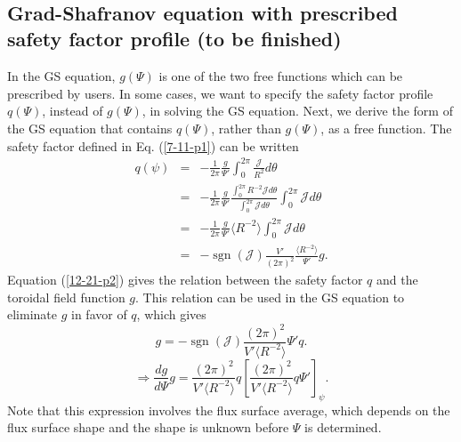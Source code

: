\documentclass{llncs}
\newcommand{\tmop}[1]{\ensuremath{\operatorname{#1}}}
\begin{document}
\

\subsection{Grad-Shafranov equation with prescribed safety factor profile (to
be finished)}

In the GS equation, $g (\Psi)$ is one of the two free functions which can be
prescribed by users. In some cases, we want to specify the safety factor
profile $q (\Psi)$, instead of $g (\Psi)$, in solving the GS equation. Next,
we derive the form of the GS equation that contains $q (\Psi)$, rather than $g
(\Psi)$, as a free function. The safety factor defined in Eq. (\ref{7-11-p1})
can be written
\begin{eqnarray}
  q (\psi) & = & - \frac{1}{2 \pi}  \frac{g}{\Psi'} \int_0^{2 \pi}
  \frac{\mathcal{J}}{R^2} d \theta \\
  & = & - \frac{1}{2 \pi}  \frac{g}{\Psi'}  \frac{\int_0^{2 \pi} R^{- 2}
  \mathcal{J}d \theta}{\int_0^{2 \pi} \mathcal{J}d \theta} \int_0^{2 \pi}
  \mathcal{J}d \theta \nonumber\\
  & = & - \frac{1}{2 \pi}  \frac{g}{\Psi'} \langle R^{- 2} \rangle \int_0^{2
  \pi} \mathcal{J}d \theta \\
  & = & - \tmop{sgn} (\mathcal{J}) \frac{V'}{(2 \pi)^2}  \frac{\langle R^{-
  2} \rangle}{\Psi'} g.  \label{12-21-p2}
\end{eqnarray}
Equation (\ref{12-21-p2}) gives the relation between the safety factor $q$ and
the toroidal field function $g$. This relation can be used in the GS equation
to eliminate $g$ in favor of $q$, which gives
\begin{equation}
  g = - \tmop{sgn} (\mathcal{J}) \frac{(2 \pi)^2}{V' \langle R^{- 2} \rangle}
  \Psi' q.
\end{equation}
\begin{equation}
  \label{4-18-p3} \Rightarrow \frac{d g}{d \Psi} g = \frac{(2 \pi)^2}{V'
  \langle R^{- 2} \rangle} q \left[ \frac{(2 \pi)^2}{V' \langle R^{- 2}
  \rangle} q \Psi' \right]_{\psi} .
\end{equation}
Note that this expression involves the flux surface average, which depends on
the flux surface shape and the shape is unknown before $\Psi$ is determined.
\end{document}
